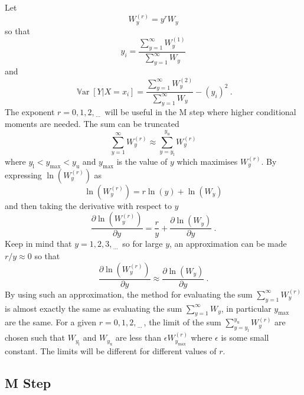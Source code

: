 \documentclass[12pt, a4paper]{memoir}
\DeclareMathOperator{\variance}{\mathbb{V}ar}
\newcommand{\dotdotdot}{_{\phantom{.}\cdots}}
\begin{document}
Let
\begin{equation}
	W_y^{(r)} = y^r W_y
\end{equation}
so that
\begin{equation}
	y_i = \frac{\sum_{y=1}^\infty W^{(1)}_y}{\sum_{y=1}^\infty W_y}
\end{equation}
and
\begin{equation}
	\variance[Y|X=x_i] = \frac{\sum_{y=1}^\infty W^{(2)}_y}{\sum_{y=1}^\infty W_y} - \left(y_i\right)^2
	\ .
\end{equation}
The exponent $r=0,1,2,\dotdotdot$ will be useful in the M step where higher conditional moments are needed.
The sum can be truncated
\begin{equation}
	\sum_{y=1}^\infty W^{(r)}_y \approx \sum_{y=y_\text{l}}^{y_\text{u}} W^{(r)}_y
\end{equation}
where $y_\text{l}<y_\text{max}<y_\text{u}$ and $y_\text{max}$ is the value of $y$ which maximises $W_y^{(r)}$. By expressing $\ln(W^{(r)}_y)$ as
\begin{equation}
	\ln\left(W_y^{(r)}\right)=r\ln(y)+\ln(W_y)
\end{equation}
and then taking the derivative with respect to $y$
\begin{equation}
	\frac{\partial \ln(W_y^{(r)})}{\partial y} = \frac{r}{y } + \frac{\partial \ln(W_y)}{\partial y}
	\ .
\end{equation}
Keep in mind that $y=1,2,3,\dotdotdot$ so for large $y$, an approximation can be made $r/y\approx 0$ so that
\begin{equation}
	\frac{\partial \ln(W_y^{(r)})}{\partial y} \approx \frac{\partial \ln(W_y)}{\partial y}
	\ .
\end{equation}
By using such an approximation, the method for evaluating the sum $\sum_{y=1}^\infty W^{(r)}_y$ is almost exactly the same as evaluating the sum $\sum_{y=1}^\infty W_y$, in particular $y_\text{max}$ are the same. For a given $r=0,1,2,\dotdotdot$, the limit of the sum $\sum_{y=y_\text{l}}^{y_\text{u}} W^{(r)}_y$ are chosen such that $W_{y_\text{l}}$ and $W_{y_\text{u}}$ are less than $\epsilon W_{y_\text{max}}^{(r)}$ where $\epsilon$ is some small constant. The limits will be different for different values of $r$.

\subsection{M Step}
\end{document}
